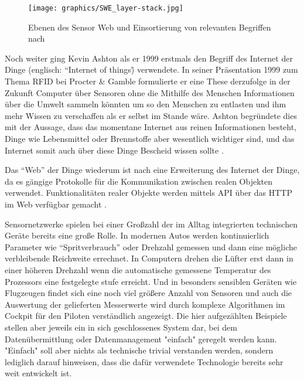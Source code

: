\begin{figure}[H]
	\centering
 	 \texttt{[image: graphics/SWE\_layer-stack.jpg]} 
	\caption{Ebenen des Sensor Web und Einsortierung von relevanten Begriffen nach \citep{broring_new_2011}}
	 \label{fig:swe_layer-stack}
\end{figure}

Noch weiter ging Kevin Ashton als er 1999 erstmals den Begriff des Internet der Dinge (englisch: ``Internet of things\") verwendete. In seiner Präsentation 1999 zum Thema  \gls{RFID} bei Procter \& Gamble formulierte er eine These derzufolge in der Zukunft Computer über Sensoren ohne die Mithilfe des Menschen Informationen über die Umwelt sammeln könnten um so den Menschen zu entlasten und ihm mehr Wissen zu verschaffen als er selbst im Stande wäre. Ashton begründete dies mit der Aussage, dass das momentane Internet aus reinen Informationen besteht, Dinge wie Lebensmittel oder Brennstoffe aber wesentlich wichtiger sind, und das Internet somit auch über diese Dinge Bescheid wissen sollte \citep{ashton_that_2009}.

Das ``Web'' der Dinge wiederum ist nach \citep{broring_new_2011} eine Erweiterung des Internet der Dinge, da es gängige Protokolle für die Kommunikation zwischen realen Objekten verwendet. Funktionalitäten realer Objekte werden mittels \gls{API} über das \gls{HTTP} im Web verfügbar gemacht \citep{guinard_towards_2009}.

Sensornetzwerke spielen bei einer Großzahl der im Alltag integrierten technischen Geräte bereits eine große Rolle. In modernen Autos werden kontinuierlich Parameter wie ``Spritverbrauch'' oder Drehzahl gemessen und dann eine mögliche verbleibende Reichweite errechnet. In Computern drehen die Lüfter erst dann in einer höheren Drehzahl wenn die automatische gemessene Temperatur des Prozessors eine festgelegte stufe erreicht. Und in besonders sensiblen Geräten wie Flugzeugen findet sich eine noch viel größere Anzahl von Sensoren und auch die Auswertung der gelieferten Messerwerte wird durch komplexe Algorithmen im Cockpit für den Piloten verständlich angezeigt. Die hier aufgezählten Beispiele stellen aber jeweils ein in sich geschlossenes System dar, bei dem Datenübermittlung oder Datenmanagement "einfach" geregelt werden kann. "Einfach" soll aber nichts als technische trivial verstanden werden, sondern lediglich darauf hinweisen, dass die dafür verwendete Technologie bereits sehr weit entwickelt ist. 

